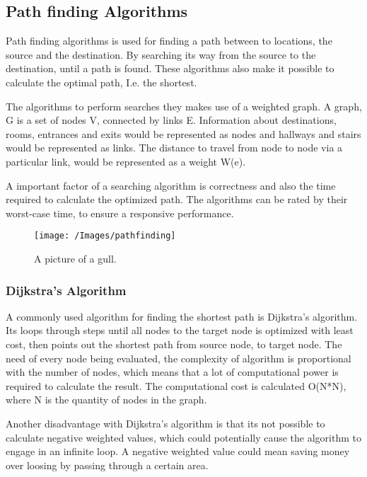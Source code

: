 \subsection{Path finding Algorithms}

  Path finding algorithms is used for finding a path between to locations, the source and the destination. By searching its way from the source to the destination, until a path is found. These algorithms also make it possible to calculate the optimal path, I.e. the shortest.

  The algorithms to perform searches they makes use of a weighted graph. A graph, G is a set of nodes V, connected by links E.
  Information about destinations, rooms, entrances and exits would be represented as nodes and hallways and stairs would be represented as links. The distance to travel from node to node via a particular link, would be represented as a weight W(e).

  A important factor of a searching algorithm is correctness and also the time required to calculate the optimized path.
  The algorithms can be rated by their worst-case time, to ensure a responsive performance.

  \begin{figure}[h!]
  \caption{A picture of a gull.}
  \centering
    \texttt{[image: /Images/pathfinding]}
  \end{figure}

  \subsubsection{Dijkstra's Algorithm}

  A commonly used algorithm for finding the shortest path is Dijkstra's algorithm. Its loops through steps until all nodes to the target node is optimized with least cost, then points out the shortest path from source node, to target node. The need of every node being evaluated, the complexity of algorithm is proportional with the number of nodes, which means that a lot of computational power is required to calculate the result. The computational cost is calculated O(N*N), where N is the quantity of nodes in the graph.

  Another disadvantage with Dijkstra's algorithm is that its not possible to calculate negative weighted values, which could potentially cause the algorithm to engage in an infinite loop. A negative weighted value could mean saving money over loosing by passing through a certain area.

